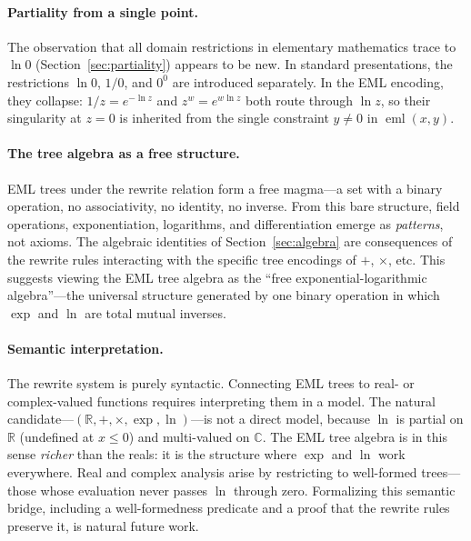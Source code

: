 \documentclass[11pt]{article}
\begin{document}
\paragraph{Partiality from a single point.}
The observation that all domain restrictions in elementary mathematics
trace to $\ln 0$ (Section~\ref{sec:partiality}) appears to be new.
In standard presentations, the restrictions $\ln 0$, $1/0$, and
$0^0$ are introduced separately.  In the EML encoding, they collapse:
$1/z = e^{-\ln z}$ and $z^w = e^{w \ln z}$ both route through $\ln z$,
so their singularity at $z = 0$ is inherited from the single constraint
$y \neq 0$ in $\operatorname{eml}(x,y)$.

\paragraph{The tree algebra as a free structure.}
EML trees under the rewrite relation form a free magma---a set with a
binary operation, no associativity, no identity, no inverse.  From this
bare structure, field operations, exponentiation, logarithms, and
differentiation emerge as \emph{patterns}, not axioms.  The algebraic
identities of Section~\ref{sec:algebra} are consequences of the
rewrite rules interacting with the specific tree encodings of $+$,
$\times$, etc.  This suggests viewing the EML tree algebra as the
``free exponential-logarithmic algebra''---the universal structure
generated by one binary operation in which $\exp$ and $\ln$ are total
mutual inverses.

\paragraph{Semantic interpretation.}
The rewrite system is purely syntactic.  Connecting EML trees to
real- or complex-valued functions requires interpreting them in a
model.  The natural candidate---$(\mathbb{R}, +, \times, \exp,
\ln)$---is not a direct model, because $\ln$ is partial on
$\mathbb{R}$ (undefined at $x \le 0$) and multi-valued on
$\mathbb{C}$.  The EML tree algebra is in this sense \emph{richer}
than the reals: it is the structure where $\exp$ and $\ln$ work
everywhere.  Real and complex analysis arise by restricting to
well-formed trees---those whose evaluation never passes $\ln$
through zero.  Formalizing this semantic bridge, including a
well-formedness predicate and a proof that the rewrite rules
preserve it, is natural future work.
\end{document}
